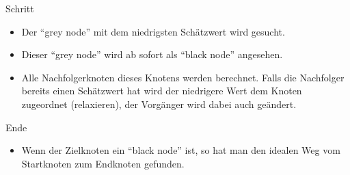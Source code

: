 \begin{frame}
	\begin{block}{Schritt}
		\begin{itemize}
			\item<2-> Der ``grey node'' mit dem niedrigsten Schätzwert wird gesucht.
			\item<3-> Dieser ``grey node'' wird ab sofort als ``black node'' angesehen.
			\item<4-> Alle Nachfolgerknoten dieses Knotens werden berechnet. Falls die Nachfolger bereits einen Schätzwert hat wird der niedrigere Wert dem Knoten zugeordnet (relaxieren), der Vorgänger wird dabei auch geändert.
		\end{itemize}
	\end{block}
\end{frame}

\begin{frame}
	\begin{block}{Ende}
		\begin{itemize}
			\item<2-> Wenn der Zielknoten ein ``black node'' ist, so hat man den idealen Weg vom Startknoten zum Endknoten gefunden.
		\end{itemize}
	\end{block}
\end{frame}

